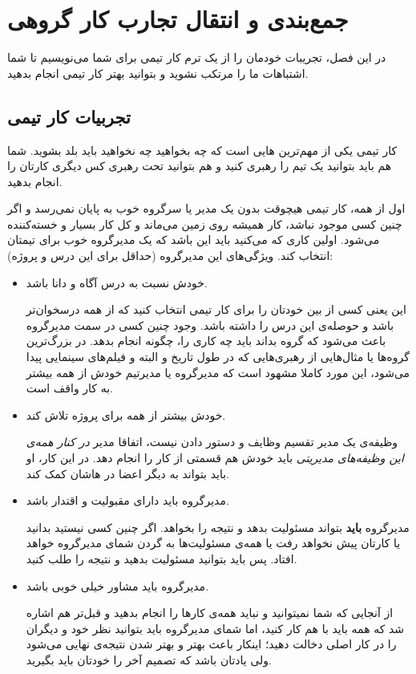 \chapter{جمع‌بندی و انتقال تجارب کار گروهی}
در این فصل، تجریبات خودمان را از یک ترم کار تیمی برای شما می‌نویسیم تا شما اشتباهات ما را مرتکب نشوید و بتوانید بهتر کار تیمی انجام بدهید.
\section{تجربیات کار تیمی}
کار تیمی یکی از مهم‌ترین ‌هایی است که چه بخواهید چه نخواهید باید بلد بشوید. شما هم باید بتوانید یک تیم را رهبری کنید و هم بتوانید تحت رهبری کس دیگری کارتان را انجام بدهید.

اول از همه، کار تیمی هیچوقت بدون یک مدیر یا سرگروه خوب به پایان نمی‌رسد و اگر چنین کسی موجود نباشد، کار همیشه روی زمین می‌ماند و کل کار بسیار  و خسته‌کننده می‌شود. اولین کاری که می‌کنید باید این باشد که یک مدیرگروه خوب برای تیمتان انتخاب کند. ویژگی‌های این مدیرگروه (حداقل برای این درس و پروژه): 
\begin{itemize}
	\item 
	خودش نسبت به درس آگاه و دانا باشد.
	
	این یعنی کسی از بین خودتان را برای کار تیمی انتخاب کنید که از همه درسخوان‌تر باشد و حوصله‌ی این درس را داشته باشد. وجود چنین کسی در سمت مدیرگروه باعث می‌شود که گروه بداند باید چه کاری را، چگونه انجام بدهد.
	در بزرگ‌ترین گروه‌ها یا مثال‌هایی از رهبری‌هایی که در طول تاریخ و البته  و فیلم‌های سینمایی پیدا می‌شود، این مورد کاملا مشهود است که مدیرگروه یا مدیرتیم خودش از همه بیشتر به کار واقف است.
	
	\item 
	خودش بیشتر از همه برای پروژه تلاش کند.
	
	وظیفه‌ی یک مدیر تقسیم وظایف و دستور دادن نیست، اتفاقا مدیر \textit{در کنار همه‌‌ی این وظیفه‌‌های مدیریتی} باید خودش هم قسمتی از کار را انجام دهد. در این کار، او باید بتواند به دیگر اعضا در ‌هاشان کمک کند.
	
	\item 
	مدیرگروه باید دارای مقبولیت و اقتدار باشد.
	
	مدیرگروه \textbf{باید} بتواند مسئولیت بدهد و نتیجه‌ را بخواهد. اگر چنین کسی نیستید بدانید یا کارتان پیش‌ نخواهد رفت یا همه‌ی مسئولیت‌ها به گردن شمای مدیرگروه خواهد افتاد. پس باید بتوانید مسئولیت بدهید و نتیجه را طلب کنید.
	
	\item 
	مدیرگروه باید مشاور خیلی خوبی باشد.
	
	از آنجایی که شما نمیتوانید و نباید همه‌ی کار‌ها را انجام بدهید و قبل‌تر هم اشاره شد که همه باید با هم کار کنید، اما شمای مدیرگروه باید بتوانید نظر خود و دیگران را در کار اصلی دخالت دهید؛ اینکار باعث بهتر و بهتر شدن نتیجه‌ی نهایی می‌شود ولی یادتان باشد که تصمیم آخر را خودتان باید بگیرید.
\end{itemize}

